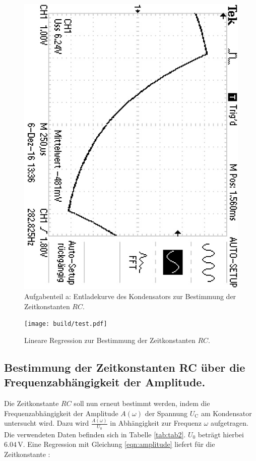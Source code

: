 \begin{figure}
	\centering
	\includegraphics[angle=90]{bilder/F0000TEK.JPG}
	\caption{Aufgabenteil a: Entladekurve des Kondensators zur Bestimmung der Zeitkonstanten $RC$.}
	\label{fig:plotrc}
\end{figure}

\begin{figure}
	\centering
	\texttt{[image: build/test.pdf]}
	\caption{Lineare Regression zur Bestimmung der Zeitkonstanten $RC$.}
	\label{fig:plota}
\end{figure}

\subsection{Bestimmung der Zeitkonstanten RC über die Frequenzabhängigkeit der Amplitude.}
Die Zeitkonstante $RC$ soll nun erneut bestimmt werden, indem die Frequenzabhängigkeit der Amplitude $A(\omega)$ der Spannung $U_\text{C}$ am Kondensator untersucht wird.
Dazu wird $\frac{A(\omega)}{U_\text{0}}$ in Abhängigkeit zur Frequenz $\omega$ aufgetragen. Die verwendeten Daten befinden sich in Tabelle \ref{tab:tab2}.
$U_{\mathrm{0}}$ beträgt hierbei $6.04 \,\si{\volt}$.
Eine Regression mit Gleichung \eqref{eqn:amplitude} liefert für die Zeitkonstante :

